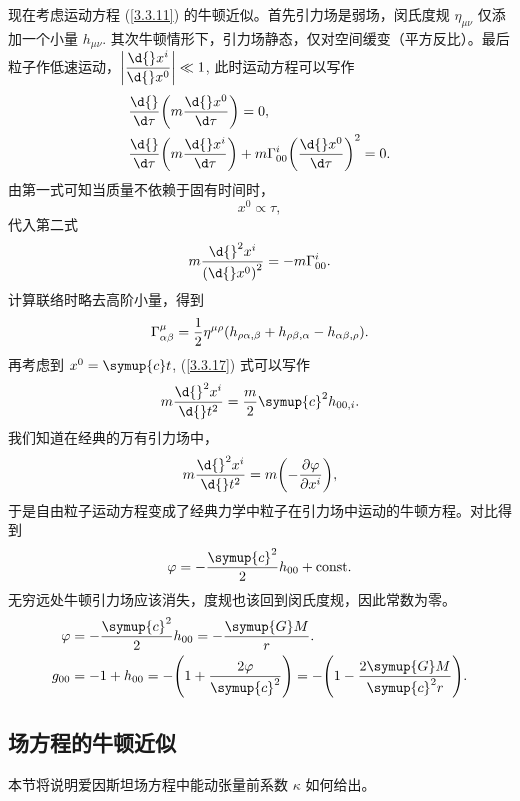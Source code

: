 \documentclass[UTF8, 12pt, a4paper, oneside, onecolumn, fontset=none]{ctexart}
\begin{document}
现在考虑运动方程 (\ref{3.3.11}) 的牛顿近似。首先引力场是弱场，闵氏度规 $\eta_{\mu\nu}$ 仅添加一个小量 $h_{\mu\nu}$. 其次牛顿情形下，引力场静态，仅对空间缓变（平方反比）。最后粒子作低速运动，$\mleft\vert\dfrac{\d{}x^{i}}{\d{}x^{0}}\mright\vert\ll1$, 此时运动方程可以写作
\begin{align}
&\frac{\d{}}{\d\tau}\mleft(m\frac{\d{}x^{0}}{\d\tau}\mright)=0,\\
&\frac{\d{}}{\d\tau}\mleft(m\frac{\d{}x^{i}}{\d\tau}\mright)+m\Gamma_{00}^{i}\mleft(\frac{\d{}x^{0}}{\d\tau}\mright)^{2}=0.
\end{align}
由第一式可知当质量不依赖于固有时间时，
\begin{equation}
x^{0}\propto\tau,
\end{equation}
代入第二式
\begin{equation}
m\frac{\d{}^{2}x^{i}}{\mleft(\d{}x^{0}\mright)^{2}}=-m\Gamma_{00}^{i}.\label{3.3.17}
\end{equation}
计算联络时略去高阶小量，得到
\begin{equation}
\Gamma_{\alpha\beta}^{\mu}=\frac{1}{2}\eta^{\mu\rho}\mleft(h_{\rho\alpha,\beta}+h_{\rho\beta,\alpha}-h_{\alpha\beta,\rho}\mright).
\end{equation}
再考虑到 $x^{0}=\symup{c}t$, (\ref{3.3.17}) 式可以写作
\begin{equation}
m\frac{\d{}^{2}x^{i}}{\d{}t^{2}}=\frac{m}{2}\symup{c}^{2}h_{00, i}.
\end{equation}
我们知道在经典的万有引力场中，
\begin{equation}
m\frac{\d{}^{2}x^{i}}{\d{}t^{2}}=m\mleft(-\frac{\partial\varphi}{\partial{}x^{i}}\mright),
\end{equation}
于是自由粒子运动方程变成了经典力学中粒子在引力场中运动的牛顿方程。对比得到
\begin{equation}
\varphi=-\frac{\symup{c}^{2}}{2}h_{00}+\mathrm{const}.
\end{equation}
无穷远处牛顿引力场应该消失，度规也该回到闵氏度规，因此常数为零。
\begin{align}
\varphi&=-\frac{\symup{c}^{2}}{2}h_{00}=-\frac{\symup{G}M}{r}.\\
g_{00}&=-1+h_{00}=-\mleft(1+\frac{2\varphi}{\symup{c}^{2}}\mright)=-\mleft(1-\frac{2\symup{G}M}{\symup{c}^{2}r}\mright).
\end{align}

\subsection{场方程的牛顿近似}
本节将说明爱因斯坦场方程中能动张量前系数 $\kappa$ 如何给出。
\end{document}
